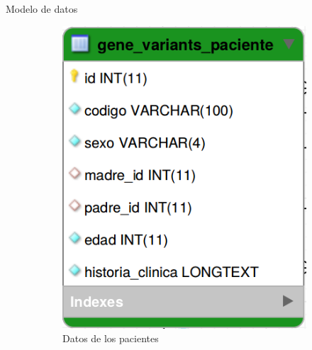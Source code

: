 \documentclass[xcolor=dvipsnames]{beamer}
\begin{document}
\begin{frame}{Modelo de datos}
      \begin{figure}
		\centering
		\begin{subfigure}[b]{0.2\textwidth}
			\includegraphics[width=\textwidth]{tabla1.png}
			\caption{Datos de los pacientes}
		\end{subfigure}
		\quad
		~ %
		\begin{subfigure}[b]{0.2\textwidth}

\end{subfigure}
\end{figure}
\end{frame}
\end{document}
